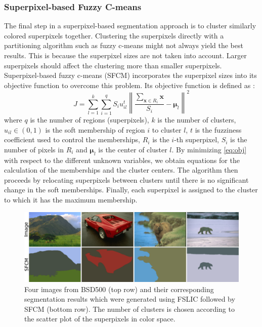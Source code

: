 \subsubsection{Superpixel-based Fuzzy C-means}

The final step in a superpixel-based segmentation approach is to cluster similarly colored superpixels together. Clustering the superpixels directly with a partitioning algorithm such as fuzzy c-means might not always yield the best results. This is because the superpixel sizes are not taken into account. Larger superpixels should affect the clustering more than smaller superpixels. Superpixel-based fuzzy c-means (SFCM) incorporates the superpixel sizes into its objective function to overcome this problem. Its objective function is defined as \parencite{lei2018superpixel}:
\begin{equation}
    J = \sum_{l=1}^{k}{\sum_{i=1}^{q}{S_i u_{il}^t \left\| \frac{\sum_{\mathbf{x} \in R_i}{\mathbf{x}}}{S_i} - \boldsymbol{\mu}_l \right\| ^2}}
\label{eq:obj}
\end{equation}
where $q$ is the number of regions (superpixels), $k$ is the number of clusters, $u_{il} \in (0, 1)$ is the soft membership of region $i$ to cluster $l$, $t$ is the fuzziness coefficient used to control the memberships, $R_i$ is the $i$-th superpixel, $S_i$ is the number of pixels in $R_i$ and $\boldsymbol{\mu}_l$ is the center of cluster $l$. By minimizing \autoref{eq:obj} with respect to the different unknown variables, we obtain equations for the calculation of the memberships and the cluster centers. The algorithm then proceeds by relocating superpixels between clusters until there is no significant change in the soft memberships. Finally, each superpixel is assigned to the cluster to which it has the maximum membership. 

\begin{figure}[t]
    \centering
    \includegraphics[width=\linewidth]{figures/clustered_images.pdf}
    \caption{Four images from BSD500 (top row) and their corresponding segmentation results which were generated using FSLIC followed by SFCM (bottom row). The number of clusters is chosen according to the scatter plot of the superpixels in color space.}
    \label{fig:sffcm}
\end{figure}

